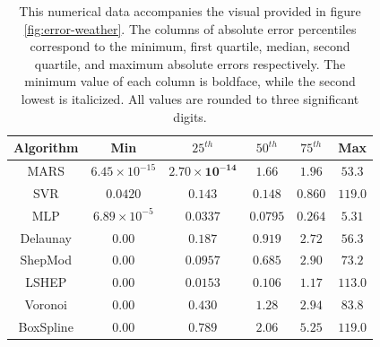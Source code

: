 \documentclass[smallextended,final]{svjour3}       %
\begin{document}
\begin{appendix}
\begin{table}
  \centering
  \begin{tabular}{c|c|c|c|c|c}
    \hline
    Algorithm & Min & $25^{th}$ & $50^{th}$ & $75^{th}$ & Max\\
    \hline
    MARS & $\mathit{6.45 \times 10^{-15}}$ & $\mathbf{2.70 \times 10^{-14}}$ & $1.66$ & $1.96$ & $\mathit{53.3}$\\
    SVR & $0.0420$ & $0.143$ & $0.148$ & $\mathit{0.860}$ & $119.0$\\
    MLP & $6.89 \times 10^{-5}$ & $0.0337$ & $\mathbf{0.0795}$ & $\mathbf{0.264}$ & $\mathbf{5.31}$\\
    Delaunay & $\mathbf{0.00}$ & $0.187$ & $0.919$ & $2.72$ & $56.3$\\
    ShepMod & $\mathbf{0.00}$ & $0.0957$ & $0.685$ & $2.90$ & $73.2$\\
    LSHEP & $\mathbf{0.00}$ & $\mathit{0.0153}$ & $\mathit{0.106}$ & $1.17$ & $113.0$\\
    Voronoi & $\mathbf{0.00}$ & $0.430$ & $1.28$ & $2.94$ & $83.8$\\
    BoxSpline & $\mathbf{0.00}$ & $0.789$ & $2.06$ & $5.25$ & $119.0$\\
    \hline
  \end{tabular}
  \caption{This numerical data accompanies the visual provided in figure \ref{fig:error-weather}. The columns of absolute error percentiles correspond to the minimum, first quartile, median, second quartile, and maximum absolute errors respectively. The minimum value of each column is boldface, while the second lowest is italicized. All values are rounded to three significant digits.}
  \label{table:error-weather}
\end{table}


\end{appendix}
\end{document}
